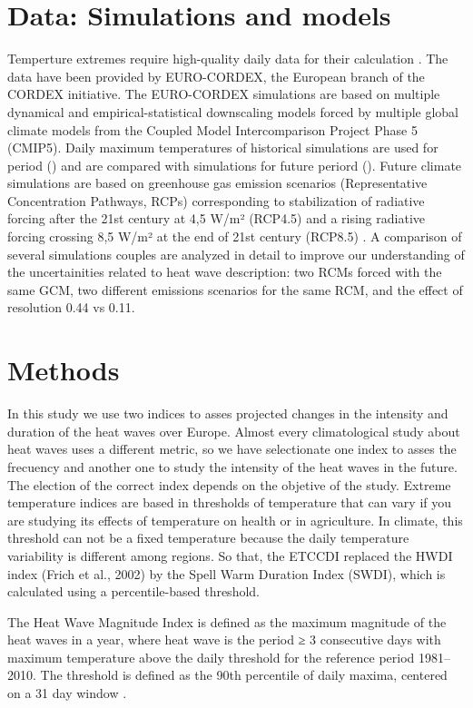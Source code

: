 \section{Data: Simulations and models}

Temperture extremes require high-quality daily data for their calculation \cite{per_2015}. The data have been provided by EURO-CORDEX, the European branch of the CORDEX initiative. The EURO-CORDEX simulations are based on multiple dynamical and empirical-statistical downscaling models forced by multiple global climate models from the Coupled Model Intercomparison Project Phase 5 (CMIP5). Daily maximum temperatures of historical simulations are used for period () and are compared with simulations for future periord (). Future climate simulations are based on greenhouse gas emission scenarios (Representative Concentration Pathways, RCPs) corresponding to stabilization of radiative forcing after the 21st century at 4,5 W/m² (RCP4.5) and a rising radiative forcing crossing 8,5 W/m² at the end of 21st century (RCP8.5) \cite{Mos_al2010}. 
A comparison of several simulations couples are analyzed in detail to improve our understanding of the uncertainities related to heat wave description: two RCMs forced with the same GCM, two different emissions scenarios for the same RCM, and the effect of resolution 0.44 vs 0.11. 


\section{Methods}

In this study we use two indices to asses projected changes in the intensity and duration of the heat waves over Europe. Almost every climatological study about heat waves  uses a different metric, so we have selectionate one index to asses the frecuency and another one to study the intensity of the heat waves  in the future. The election of the correct index depends on the objetive of the study. Extreme temperature indices are based in thresholds of temperature that can vary if you are studying its effects of temperature on health or in agriculture.  In climate, this threshold can not be a fixed temperature because the daily temperature variability is different among regions.  So that, the ETCCDI replaced the HWDI index (Frich et al., 2002) by the Spell Warm Duration Index (SWDI), which is calculated using a percentile-based threshold.     

The Heat Wave Magnitude Index is defined as the maximum magnitude of the heat waves in a year, where heat wave is the period ≥ 3 consecutive days with maximum temperature above the daily threshold for the reference period 1981–2010. The threshold is defined as the 90th percentile of daily maxima, centered on a 31 day window \cite{Rus_al2014}.

